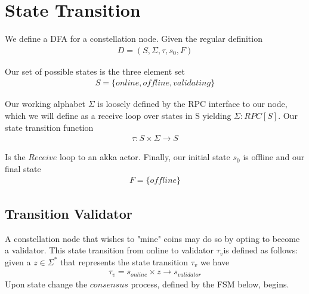 \documentclass{article}
\begin{document}
\section{State Transition}
We define a DFA for a constellation node. Given the regular definition
\begin{equation} \label{eq1}
\begin{split}
D = (S, \Sigma, \tau, s_0, F)
\end{split}
\end{equation}

Our set of possible states is the three element set
\begin{equation} \label{eq1}
\begin{split}
S = \{online, offline, validating\}
\end{split}
\end{equation}

Our working alphabet $\Sigma$ is loosely defined by the RPC interface to our node, which we will define as a receive loop over states in S yielding $\Sigma: RPC[S]$. Our state transition function
\begin{equation} \label{eq1}
\begin{split}
\tau: S \times \Sigma \rightarrow S
\end{split}
\end{equation}

Is the $Receive$ loop to an akka actor. Finally, our initial state $s_0$ is offline and our final state
\begin{equation} \label{eq1}
\begin{split}
F = \{offline\}
\end{split}
\end{equation}

\subsection{Transition Validator}
A constellation node that wishes to "mine" coins may do so by opting to become a validator. This state transition from online to validator $\tau_v$is defined as follows: given a $z \in \Sigma^{*}$ that represents the state transition $\tau_v$ we have
\begin{equation} \label{eq1}
\begin{split}
\tau_v = s_{online} \times z \rightarrow s_{validator}
\end{split}
\end{equation}
Upon state change the $consensus$ process, defined by the FSM below, begins.
\end{document}
